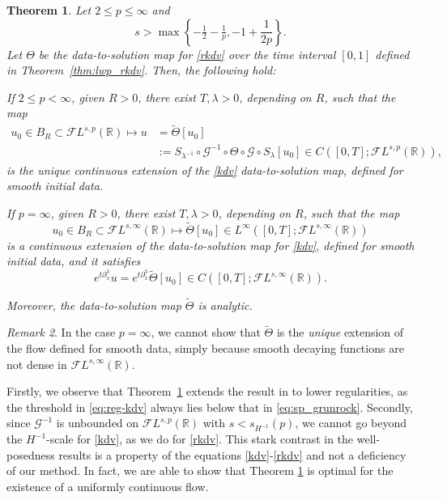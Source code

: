 \documentclass[a4paper,
11pt,  reqno]{amsart}
\newcommand{\5}{\textup{V}}
\newcommand{\noi}{\noindent}
\newcommand{\FL}{\mathcal{F} L}
\newcommand{\wt}{\widetilde}
\newcommand{\dx}{\partial_x}
\newtheorem{theorem}{Theorem} [section]
\theoremstyle{remark}
\newtheorem{remark}[theorem]{Remark}
\newcommand{\R}{\mathbb{R}}
\newcommand{\ld}{\lambda}
\newcommand{\Gc}{\mathcal{G}}
\numberwithin{equation}{section}
\numberwithin{theorem}{section}
\begin{document}
\begin{theorem}\label{thm:wp_kdv_intro} Let $2\le p\le \infty$ and
\begin{equation}
\label{eq:reg-kdv}
s>\max\left\{-\tfrac12 - \tfrac1p, -1+\frac1{2p}\right\}.
\end{equation}
Let $\Theta$ be the data-to-solution map for \eqref{rkdv} over the time interval $[0,1]$ defined in Theorem~\ref{thm:lwp_rkdv}. Then, the following hold:


\vspace{1mm}
{
\noi{\rm(i)} If $2 \le p<\infty$, given $R>0$, there exist $T, \ld>0$, depending on $R$, such that the map
\begin{align}\label{wtTa}
u_0\in B_R\subset\FL^{s,p}(\R)\mapsto u&
=\wt\Theta[u_0]
\\
&:= S_{\lambda^{-1}}\circ\mathcal{G}^{-1} \circ\Theta  \circ \Gc \circ S_\lambda[u_0]\in C([0,T];\FL^{s,p}(\R)),
\end{align}
is the unique continuous extension of the \eqref{kdv} data-to-solution map, defined for smooth initial data.
}



\smallskip

\noi{\rm(ii)} If $p=\infty$, given $R>0$, there exist $T, \ld>0$, depending on $R$, such that the map
\begin{equation}
u_0\in B_R\subset\FL^{s,\infty}(\R)\mapsto \wt\Theta[u_0]  \in L^\infty([0,T];\FL^{s,\infty}(\R))
\end{equation}
is a continuous extension of
the data-to-solution map for \eqref{kdv}, defined for smooth initial data, and it satisfies
\begin{equation}
e^{t\dx^3} u = e^{t\dx^3} \wt\Theta[u_0] \in C([0,T] ; \FL^{s,\infty}(\R))
.
\end{equation}

\noi
Moreover, the data-to-solution map $\wt{\Theta}$ is analytic.
	\end{theorem}


\begin{remark}
 In the case $p=\infty$, we cannot show that $\wt{\Theta}$ is the \emph{unique} extension of the flow defined for smooth data, simply because smooth decaying functions are not dense in $\FL^{s,\infty}(\R)$.
\end{remark}

Firstly, we observe that
Theorem~\ref{thm:wp_kdv_intro} extends the result in \cite{Grunrock_ldv_hier} to lower regularities, as the threshold in \eqref{eq:reg-kdv} always lies below that in \eqref{eq:sp_grunrock}.
Secondly, since $\Gc^{-1}$ is unbounded on $\FL^{s,p}(\R)$ with $s< s_{H^{-1}}(p) $, we cannot go beyond the $H^{-1}$-scale for \eqref{kdv}, as we do for \eqref{rkdv}. This stark contrast in the well-posedness results is a property of the equations \eqref{kdv}-\eqref{rkdv} and not a deficiency of our method. In fact, we are able to show that Theorem \ref{thm:wp_kdv_intro} is optimal for the existence of a uniformly continuous flow. 
\end{document}
